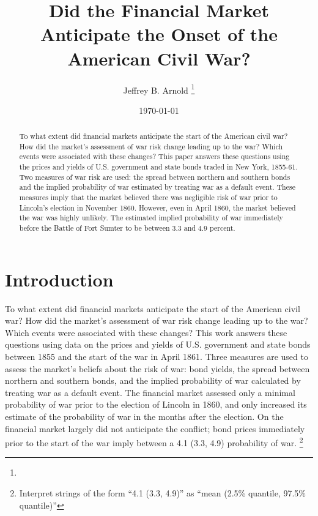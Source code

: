 \documentclass[11pt, oneside, article]{memoir}\usepackage[]{graphicx}\usepackage[]{color}
\author{Jeffrey B. Arnold \thanks{\affiliations}}
\date{\today{}}
\title{Did the Financial Market Anticipate the Onset of the American Civil War?}
\begin{document}
\begin{titlingpage}
\maketitle{}





\begin{abstract}
\footnotesize
To what extent did financial markets anticipate the start of the American civil war?
How did the market's assessment of war risk change leading up to the war?
Which events were associated with these changes?
This paper answers these questions using the prices and yields of U.S. government and state bonds traded in New York, 1855-61.
Two measures of war risk are used: the spread between northern and southern bonds and the implied probability of war estimated by treating war as a default event.
These measures imply that the market believed there was negligible risk of war prior to Lincoln's election in November 1860.
However, even in April 1860, the market believed the war was highly unlikely.
The estimated implied probability of war immediately before the Battle of Fort Sumter to be between 3.3 and 4.9 percent.
\end{abstract}

\end{titlingpage}

\section{Introduction}
\label{sec:introduction}

To what extent did financial markets anticipate the start of the American civil war?
How did the market's assessment of war risk change leading up to the war?
Which events were associated with these changes?
This work answers these questions using data on the prices and yields of U.S. government and state bonds between 1855 and the start of the war in April 1861.
Three measures are used to assess the market's beliefs about the risk of war: bond yields, the spread between northern and southern bonds, and the implied probability of war calculated by treating war as a default event.
The financial market assessed only a minimal probability of war prior to the election of Lincoln in 1860, and only increased its estimate of the probability of war in the months after the election.
On the financial market largely did not anticipate the conflict; bond prices immediately prior to the start of the war imply between a 4.1 (3.3, 4.9) probability of war.%
\footnote{Interpret strings of the form ``4.1 (3.3, 4.9)'' as ``mean (2.5\% quantile, 97.5\% quantile)''}
\end{document}
